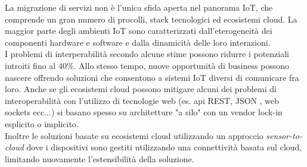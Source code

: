 \documentclass[11pt]{article}
\begin{document}
  La migrazione di servizi non è l'unica sfida aperta nel panorama IoT, che comprende un gran numero di procolli, stack tecnologici ed ecosistemi cloud.
  La maggior parte degli ambienti IoT sono caratterizzati dall'eterogeneità dei componenti hardware e software e dalla dinamicità delle loro interazioni. \\
  I problemi di interperabilità secondo alcune stime possono ridurre i potenziali introiti fino al 40\%.
  Allo stesso tempo, nuove opportunità di business possono nascere offrendo soluzioni che consentono a sistemi IoT diversi di comunicare fra loro.
  Anche se gli ecosistemi cloud possono mitigare alcuni dei problemi di interoperabilità con l'utilizzo di tecnologie web (es. api REST, JSON , web sockets ecc...) si basano spesso su architetture "a silo" con un vendor lock-in esplicito o implicito. \\
  Inoltre le soluzioni basate su ecosistemi cloud utilizzando un approccio \textit{sensor-to-cloud} dove i dispositivi sono gestiti utilizzando una connettività basata sul cloud, limitando nuovamente l'estensibilità della soluzione.
  
\end{document}

